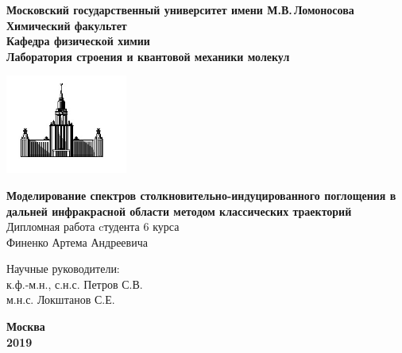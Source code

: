 \begin{titlepage}
\centering
\textbf{\large Московский государственный университет имени М.В.\,Ломоносова\\
\vspace*{0.1cm} Химический факультет\\
\vspace*{0.1cm}
\noindent\makebox[\linewidth]{\rule{\paperwidth}{0.4pt}}
\vspace*{0.1cm}
 Кафедра физической химии\\
\vspace*{0.1cm} Лаборатория строения и квантовой механики молекул \\}
\vspace*{1cm}

\begin{center}
\includegraphics[width=0.3\textwidth]{pictures/logo.jpg}
\end{center}

\Large \textbf{Моделирование спектров столкновительно-индуцированного поглощения в дальней инфракрасной области методом классических траекторий} \\
\vspace{2cm}
\Large Дипломная работа cтудента 6 курса \\
\Large Финенко Артема Андреевича
\vspace*{2cm}

\begin{flushright}
Научные руководители:\\
к.ф.-м.н., с.н.с. Петров С.В. \\
м.н.с. Локштанов С.Е. \\
\end{flushright}
\vfill
\large\textbf{Москва\\ 2019}
\end{titlepage}



